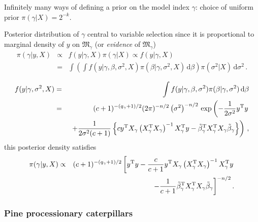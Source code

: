 \begin{slide}
\end{slide}\begin{slide}

Infinitely many ways of defining a prior on the model index 
$\gamma$: choice of uniform prior $\pi(\gamma|X)=2^{-k}$.

\vs Posterior distribution of $\gamma$ central to 
variable selection since it is proportional to marginal density of $y$ on 
$\mathfrak{M}_\gamma$ (or {\em evidence} of $\mathfrak{M}_\gamma$)
\small
\begin{eqnarray*}
\pi(\gamma|y,X) & \propto & f(y|\gamma,X)\pi(\gamma|X) \propto f(y|\gamma,X) \\
                & = & \int\left(\int f(y|\gamma,\beta,\sigma^2,X)\pi(\beta|\gamma,
			\sigma^2,X)\,\text{d}\beta\right)\pi(\sigma^2|X)\,\text{d}\sigma^2\,.
\end{eqnarray*}
\normalsize

\end{slide}\begin{slide}
\small \begin{eqnarray*}
f(y|\gamma,\sigma^2,X) &=& \int f(y|\gamma,\beta,\sigma^2)\pi(\beta|\gamma,\sigma^2)\,\text{d}\beta \\
                       &=& (c+1)^{-(q_\gamma+1)/2}(2\pi)^{-n/2}\left(\sigma^2\right)^{-n/2} 
				\,\exp\left(-\frac{1}{2\sigma^2}y^\tee y \right.\\
                       & &\ \left.+\frac{1}{2\sigma^2(c+1)}\left\{c y^\tee X_{\gamma}\left(X_{\gamma}^\tee 
			     X_{\gamma}\right)^{-1}X_{\gamma}^\tee y
                       -\tilde\beta_{\gamma}^\tee X_{\gamma}^\tee X_{\gamma} \tilde\beta_{\gamma}\right\}\right)\,,
\end{eqnarray*}
\normalsize
this posterior density satisfies
\begin{eqnarray*}
\pi(\gamma|y,X) &\propto& (c+1)^{-(q_\gamma+1)/2}\left[y^{\mathrm{T}} y-\frac{c}{c+1}y^{\mathrm{T}} X_{\gamma}\left(X_{\gamma}^{\mathrm{T}} 
			X_{\gamma}\right)^{-1}X_{\gamma}^{\mathrm{T}} y\right. \\
                &&\quad \left.-\frac{1}{c+1}\tilde\beta_{\gamma}^{\mathrm{T}} X_{\gamma}^{\mathrm{T}} X_{\gamma} \tilde\beta_{\gamma}\right]^{-n/2}.
\end{eqnarray*}
\normalsize

\end{slide}\begin{frame} \frametitle{Pine processionary caterpillars} 


\end{frame}
